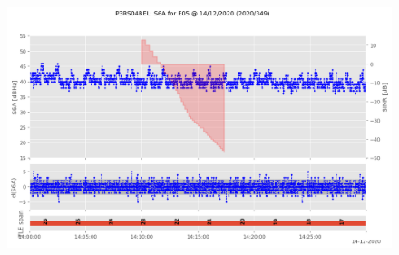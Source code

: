 \begin{enumerate}
\begin{figure}[H]%
\centering%
\includegraphics[width=0.95\linewidth]{png/P3RS04BEL_R_20203490000_01D_00U_MO_E-S6A-E05.png}%
\end{figure}


\end{enumerate}
